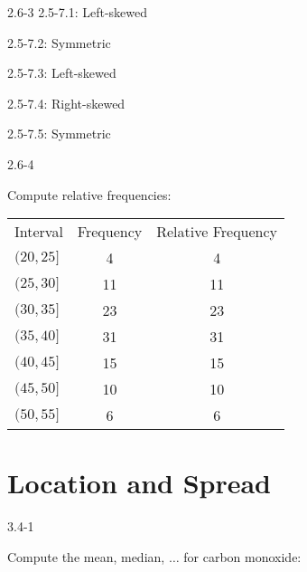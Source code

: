 \begin{exsol@solution}{2.6-3}
2.5-7.1: Left-skewed

2.5-7.2: Symmetric

2.5-7.3: Left-skewed

2.5-7.4: Right-skewed

2.5-7.5: Symmetric

\end{exsol@solution}
\begin{exsol@solution}{2.6-4}

Compute relative frequencies:

\begin{tabular}{@{} lcc @{}} \hline
Interval  &  Frequency &	Relative Frequency \\
$(20, 25]$ 	&     4 & 4  \\
$(25, 30]$ 	&    11 & 11 \\
$(30, 35]$ 	&    23 & 23 \\
$(35, 40]$ 	&    31 & 31 \\
$(40, 45]$ 	&    15 & 15 \\
$(45, 50]$ 	&    10 & 10 \\
$(50, 55]$ 	&     6 & 6 \\ \hline
\end{tabular}


\end{exsol@solution}
\setcounter{chapter}{3}\chapter{Location and Spread}
\begin{exsol@solution}{3.4-1}

	Compute the mean, median, $\dots$ for carbon monoxide:
\end{exsol@solution}
